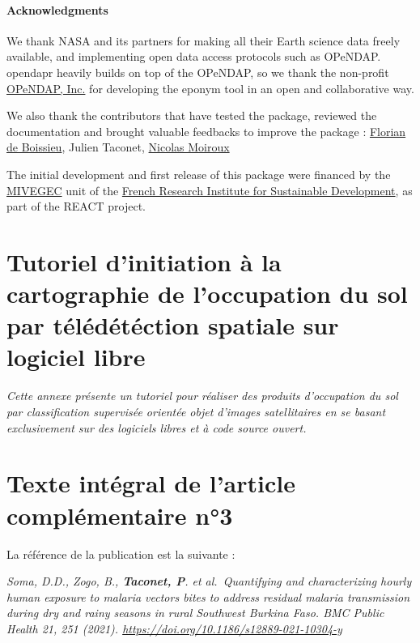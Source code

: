 \documentclass[12pt,twoside]{reedthesis}
\begin{document}
\hypertarget{acknowledgments}{%
\subsubsection{Acknowledgments}\label{acknowledgments}}

We thank NASA and its partners for making all their Earth science data freely available, and implementing open data access protocols such as OPeNDAP. opendapr heavily builds on top of the OPeNDAP, so we thank the non-profit \href{https://www.opendap.org/about}{OPeNDAP, Inc.} for developing the eponym tool in an open and collaborative way.

We also thank the contributors that have tested the package, reviewed the documentation and brought valuable feedbacks to improve the package : \href{https://github.com/floriandeboissieu}{Florian de Boissieu}, Julien Taconet, \href{https://github.com/Nmoiroux}{Nicolas Moiroux}

The initial development and first release of this package were financed by the \href{https://www.mivegec.ird.fr/en/}{MIVEGEC} unit of the \href{https://en.ird.fr/}{French Research Institute for Sustainable Development}, as part of the REACT project.

\hypertarget{formation-teledec}{%
\chapter{Tutoriel d'initiation à la cartographie de l'occupation du sol par télédétéction spatiale sur logiciel libre}\label{formation-teledec}}

\emph{Cette annexe présente un tutoriel pour réaliser des produits d'occupation du sol par classification supervisée orientée objet d'images satellitaires en se basant exclusivement sur des logiciels libres et à code source ouvert.}

\begingroup 
\renewcommand{\headrulewidth}{0pt}

\markboth{}{}


\endgroup

\hypertarget{full-article-soma}{%
\chapter{Texte intégral de l'article complémentaire n°3}\label{full-article-soma}}
\begin{lightgreenbox}
\begin{center}
La référence de la publication est la suivante :

\end{center}
\emph{Soma, D.D., Zogo, B., \textbf{Taconet, P}. et al.~Quantifying and characterizing hourly human exposure to malaria vectors bites to address residual malaria transmission during dry and rainy seasons in rural Southwest Burkina Faso. BMC Public Health 21, 251 (2021). \url{https://doi.org/10.1186/s12889-021-10304-y}}

\end{lightgreenbox}
\begingroup 
\renewcommand{\headrulewidth}{0pt}
\end{document}

